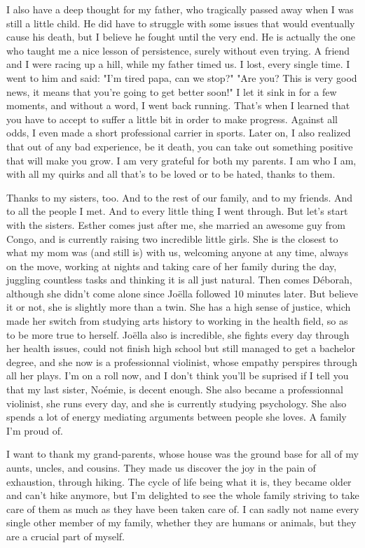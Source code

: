 I also have a deep thought for my father, who tragically passed away when I was still a little child. He did have to struggle with some issues that would eventually cause his death, but I believe he fought until the very end. He is actually the one who taught me a nice lesson of persistence, surely without even trying. A friend and I were racing up a hill, while my father timed us. I lost, every single time. I went to him and said: "I'm tired papa, can we stop?" "Are you? This is very good news, it means that you're going to get better soon!" I let it sink in for a few moments, and without a word, I went back running. That's when I learned that you have to accept to suffer a little bit in order to make progress. Against all odds, I even made a short professional carrier in sports. Later on, I also realized that out of any bad experience, be it death, you can take out something positive that will make you grow. I am very grateful for both my parents. I am who I am, with all my quirks and all that's to be loved or to be hated, thanks to them.

Thanks to my sisters, too. And to the rest of our family, and to my friends. And to all the people I met. And to every little thing I went through. But let's start with the sisters. Esther comes just after me, she married an awesome guy from Congo, and is currently raising two incredible little girls. She is the closest to what my mom was (and still is) with us, welcoming anyone at any time, always on the move, working at nights and taking care of her family during the day, juggling countless tasks and thinking it is all just natural. Then comes Déborah, although she didn't come alone since Joëlla followed 10 minutes later. But believe it or not, she is slightly more than a twin. She has a high sense of justice, which made her switch from studying arts history to working in the health field, so as to be more true to herself. Joëlla also is incredible, she fights every day through her health issues, could not finish high school but still managed to get a bachelor degree, and she now is a professionnal violinist, whose empathy perspires through all her plays. I'm on a roll now, and I don't think you'll be suprised if I tell you that my last sister, Noémie, is decent enough. She also became a professionnal violinist, she runs every day, and she is currently studying psychology. She also spends a lot of energy mediating arguments between people she loves. A family I'm proud of.

I want to thank my grand-parents, whose house was the ground base for all of my aunts, uncles, and cousins. They made us discover the joy in the pain of exhaustion, through hiking. The cycle of life being what it is, they became older and can't hike anymore, but I'm delighted to see the whole family striving to take care of them as much as they have been taken care of. I can sadly not name every single other member of my family, whether they are humans or animals, but they are a crucial part of myself.

